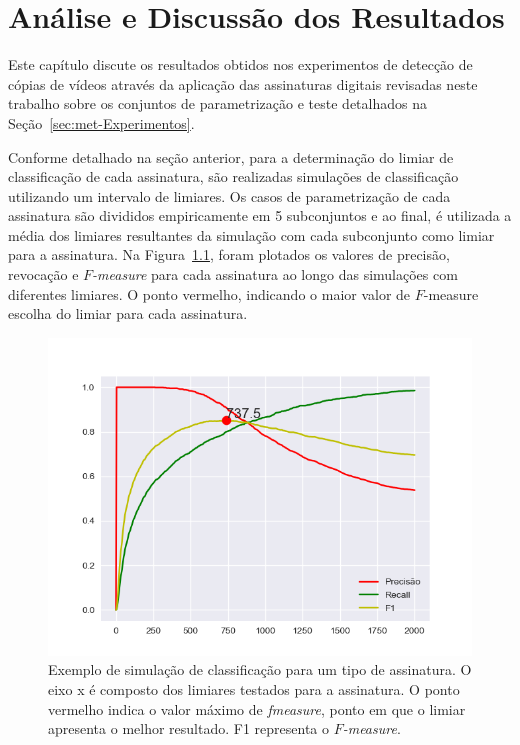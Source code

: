 
\chapter{Análise e Discussão dos Resultados}
\label{chap:resultados}

Este capítulo discute os resultados obtidos nos experimentos de detecção de cópias de vídeos através da aplicação das assinaturas digitais revisadas neste trabalho sobre os conjuntos de parametrização e teste detalhados na Seção~\ref{sec:met-Experimentos}.

Conforme detalhado na seção anterior, para a determinação do limiar de classificação de cada assinatura, são realizadas simulações de classificação utilizando um intervalo de limiares. Os casos de parametrização de cada assinatura são divididos empiricamente em 5 subconjuntos e ao final, é utilizada a média dos limiares resultantes da simulação com cada subconjunto como limiar para a assinatura. Na Figura~\ref{fig:exemplo-simulacao}, foram plotados os valores de precisão, revocação e \textit{$F$-measure} para cada assinatura ao longo das simulações com diferentes limiares. O ponto vermelho, indicando o maior valor de $F$-measure escolha do limiar para cada assinatura.

\begin{figure}[h]
	\centering
	\caption{Exemplo de simulação de classificação para um tipo de assinatura. O eixo x é composto dos limiares testados para a assinatura. O ponto vermelho indica o valor máximo de \textit{fmeasure}, ponto em que o limiar apresenta o melhor resultado. F1 representa o \textit{$F$-measure}.}
	\label{fig:exemplo-simulacao}
	\includegraphics[width=\textwidth]{dados/figuras/experimentos/limiar_Medida_Ordinal_0.png}
\end{figure}

